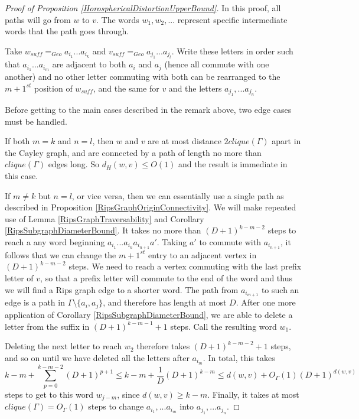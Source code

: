 \documentclass{amsart}
\theoremstyle{definition}
\theoremstyle{remark}
\begin{document}
	\begin{proof} [Proof of Proposition \ref{HorosphericalDistortionUpperBound}]
		
		In this proof, all paths will go from $w$ to $v$. The words $w_1, w_2, ...$ represent specific intermediate words that the path goes through.
		
		Take $w_{suff} =_{Geo} a_{i_1} ... a_{i_k}$ and $v_{suff} =_{Geo} a_{j_1} ... a_{j_l}$. Write these letters in order such that $a_{i_1} ... a_{i_m}$ are adjacent to both $a_i$ and $a_j$ (hence all commute with one another) and no other letter commuting with both can be rearranged to the $m+1^{st}$ position of $w_{suff}$, and the same for $v$ and the letters $a_{j_1}, ... a_{j_n}$.
		
		Before getting to the main cases described in the remark above, two edge cases must be handled.
		
		If both $m=k$ and $n=l$, then $w$ and $v$ are at most distance $2clique(\Gamma)$ apart in the Cayley graph, and are connected by a path of length no more than $clique(\Gamma)$ edges long. So $d_H(w, v)\le O(1)$ and the result is immediate in this case.
		
		If $m\ne k$ but $n=l$, or vice versa, then we can essentially use a single path as described in Proposition \ref{RipsGraphOriginConnectivity}. We will make repeated use of Lemma \ref{RipsGraphTraversability} and Corollary \ref{RipsSubgraphDiameterBound}. It takes no more than $(D+1)^{k-m-2}$ steps to reach a any word beginning $a_{i_1} ... a_{i_n}a_{i_{n+1}}a'$. Taking $a'$ to commute with $a_{i_{n+1}}$, it follows that we can change the $m+1^{st}$ entry to an adjacent vertex in $(D+1)^{k-m-2}$ steps. We need to reach a vertex commuting with the last prefix letter of $v$, so that a prefix letter will commute to the end of the word and thus we will find a Rips graph edge to a shorter word. The path from $a_{i_{m+1}}$ to such an edge is a path in $\Gamma\setminus  \{a_i, a_j\}$, and therefore has length at most $D$. After one more application of Corollary \ref{RipsSubgraphDiameterBound}, we are able to delete a letter from the suffix in $(D+1)^{k-m-1}+1$ steps. Call the resulting word $w_1$.
		
		Deleting the next letter to reach $w_2$ therefore takes $(D+1)^{k-m-2}+1$ steps, and so on until we have deleted all the letters after $a_{i_m}$. In total, this takes $$k-m+\sum_{p=0}^{k-m-2} (D+1)^{p+1} \le k-m+\frac{1}{D}(D+1)^{k-m}\le d(w,v)+O_\Gamma(1)(D+1)^{d(w,v)}$$ steps to get to this word $w_{j-m}$, since $d(w,v)\ge k-m$. Finally, it takes at most \newline $clique(\Gamma) = O_\Gamma(1)$ steps to change $a_{i_1}, ... a_{i_m}$ into $a_{j_1}, ... a_{j_n}$. 
		

\end{proof}
\end{document}
